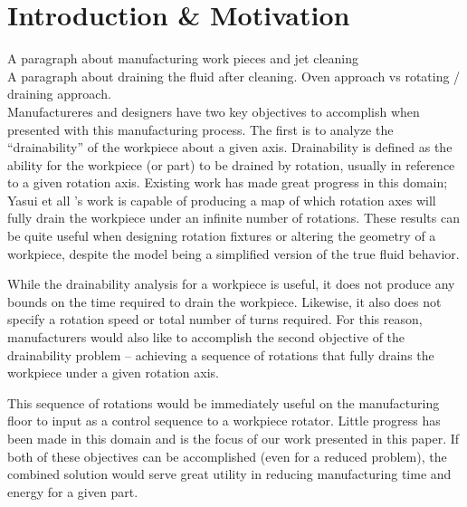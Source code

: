 							\chapter{Introduction \& Motivation}

A paragraph about manufacturing work pieces and jet cleaning
\\

A paragraph about draining the fluid after cleaning. Oven approach vs rotating / draining approach.
\\

Manufactureres and designers have two key objectives to accomplish when presented with this manufacturing process. The first is to analyze the ``drainability'' of the workpiece about a given axis. Drainability is defined as the ability for the workpiece (or part) to be drained by rotation, usually in reference to a given rotation axis. Existing work has made great progress in this domain; Yasui et all \cite{plot}'s work is capable of producing a map of which rotation axes will fully drain the workpiece under an infinite number of rotations. These results can be quite useful when designing rotation fixtures or altering the geometry of a workpiece, despite the model being a simplified version of the true fluid behavior.

While the drainability analysis for a workpiece is useful, it does not produce any bounds on the time required to drain the workpiece. Likewise, it also does not specify a rotation speed or total number of turns required. For this reason, manufacturers would also like to accomplish the second objective of the drainability problem -- achieving a sequence of rotations that fully drains the workpiece under a given rotation axis.

This sequence of rotations would be immediately useful on the manufacturing floor to input as a control sequence to a workpiece rotator. Little progress has been made in this domain and is the focus of our work presented in this paper. If both of these objectives can be accomplished (even for a reduced problem), the combined solution would serve great utility in reducing manufacturing time and energy for a given part.

